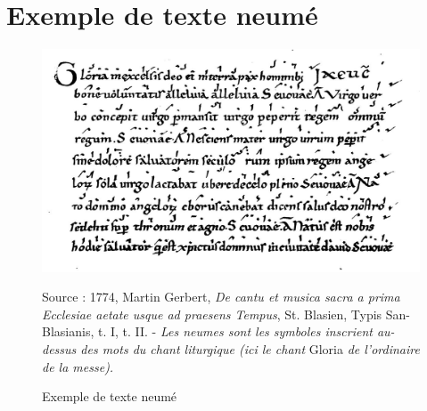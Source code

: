 
\section{Exemple de texte neumé}
\label{sec:exempleTexteNeume}
\begin{figure}[H]
	\centering
	\includegraphics[keepaspectratio=true, width=\textwidth]{Annexes/i/neumes.jpg}
	\caption{Exemple de texte neumé  }
	\medskip
	\small	
	Source : 1774, Martin Gerbert, \textit{De cantu et musica sacra a prima Ecclesiae aetate usque ad praesens Tempus}, St. Blasien, Typis San-Blasianis, t. I, t. II. - \textit{Les neumes sont les symboles inscrient au-dessus des mots du chant liturgique (ici le chant} Gloria \textit{de l'ordinaire de la messe).}
	\label{fig:neumes}
\end{figure}
\clearpage

